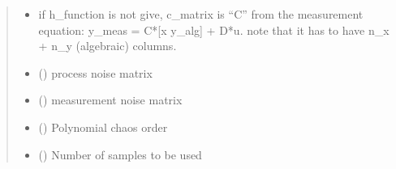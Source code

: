 \documentclass[letterpaper,10pt,english]{sphinxmanual}
\begin{document}
\begin{fulllineitems}
\begin{fulllineitems}
\begin{quote}
\begin{description}
\begin{itemize}
\item {} 
 \textendash{} if h\_function is not give, c\_matrix is “C” from the measurement equation:
y\_meas = C*{[}x y\_alg{]} + D*u. note that it has to have n\_x + n\_y (algebraic) columns.

\item {} 
 () \textendash{} process noise matrix

\item {} 
 () \textendash{} measurement noise matrix

\item {} 
 () \textendash{} Polynomial chaos order

\item {} 
 () \textendash{} Number of samples to be used

\end{itemize}

\end{description}\end{quote}

\end{fulllineitems}


\begin{fulllineitems}
\label{\detokenize{yaocptool.estimation:yaocptool.estimation.pce_kalman_filter.PCEKalmanFilter.estimate}}
\end{fulllineitems}


\begin{fulllineitems}
\label{\detokenize{yaocptool.estimation:yaocptool.estimation.pce_kalman_filter.PCEKalmanFilter.n_pol_parameters}}
\end{fulllineitems}


\end{fulllineitems}
\end{document}
